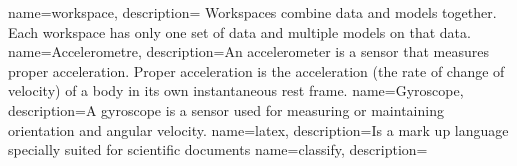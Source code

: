 {
    name={workspace},
    description={%
        Workspaces combine data and models together. Each workspace has only one set of data and multiple models on that data.
    }
}
{
    name={Accelerometre},
    description={An accelerometer is a sensor that measures proper acceleration. Proper acceleration is the acceleration (the rate of change of velocity) of a body in its own instantaneous rest frame.
    }
}
{
    name={Gyroscope},
    description={A gyroscope is a sensor used for measuring or maintaining orientation and angular velocity. 
    }
}
{
    name={latex},
    description={Is a mark up language specially suited for scientific documents}
}
{
    name={classify},
    description={}
}